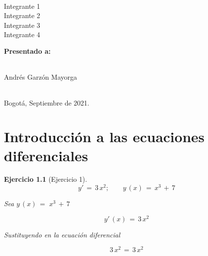 \documentclass[a4paper,11pt]{book}
\newtheorem{ejer}{Ejercicio}[section]
\begin{document}
\begin{titlepage}
\begin{center}
\begin{large}
  

\  

  

Integrante 1 \\ 

  

Integrante 2 \\ 

  

Integrante 3 \\ 

  

Integrante 4 

\end{large} 

\vspace*{0.3in} 

  

\end{center} 

  

\begin{center} 

{\bf Presentado a:} \\ 

  

\  

  

Andrés Garzón Mayorga \\ 

  

\ 

  

Bogot{\'a}, Septiembre de 2021. 

\end{center} 

  

\end{titlepage} 

  

\tableofcontents 

  

\chapter{Introducción a las ecuaciones diferenciales} 

  

\begin{ejer}[Ejercicio 1] 


$$y'\,=\,3\,x^{2}; \qquad \boxed{y\,(x)\,=\,x^{3}\,+\,7}$$
 
 Sea $y\,(x)\,=\,\,x^{3}\,+\,7$
 
 $$y'\,(x)\,=\,3\,x^{2}$$
 
 
 Sustituyendo en la ecuación diferencial
 
 $$\boxed{{3\,x^{2}}\,=\,3\,x^{2}}$$
    
\end{ejer} 
\end{document}
